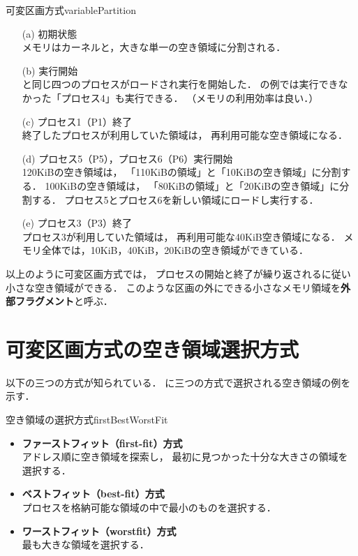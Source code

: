{可変区画方式}{variablePartition}

\begin{enumerate}
\item[(a)] 初期状態 \\
メモリはカーネルと，大きな単一の空き領域に分割される．
\item[(b)] 実行開始 \\
と同じ四つのプロセスがロードされ実行を開始した．
の例では実行できなかった「プロセス4」も実行できる．
（メモリの利用効率は良い．）
\item[(c)] プロセス1（P1）終了 \\
終了したプロセスが利用していた領域は，
再利用可能な空き領域になる．
\item[(d)] プロセス5（P5），プロセス6（P6）実行開始 \\
120KiBの空き領域は，
「110KiBの領域」と「10KiBの空き領域」に分割する．
100KiBの空き領域は，
「80KiBの領域」と「20KiBの空き領域」に分割する．
プロセス5とプロセス6を新しい領域にロードし実行する．
\item[(e)] プロセス3（P3）終了 \\
プロセス3が利用していた領域は，
再利用可能な40KiB空き領域になる．
メモリ全体では，10KiB，40KiB，20KiBの空き領域ができている．
\end{enumerate}

以上のように可変区画方式では，
プロセスの開始と終了が繰り返されるに従い小さな空き領域ができる．
このような区画の外にできる小さなメモリ領域を{\bf 外部フラグメント}と呼ぶ．

\section{可変区画方式の空き領域選択方式}
以下の三つの方式が知られている．
に三つの方式で選択される空き領域の例を示す．

{空き領域の選択方式}{firstBestWorstFit}

\begin{itemize}
\item {\bf ファーストフィット（first-fit）方式}\\
アドレス順に空き領域を探索し，
最初に見つかった十分な大きさの領域を選択する．

\item {\bf ベストフィット（best-fit）方式}\\
プロセスを格納可能な領域の中で最小のものを選択する．

\item {\bf ワーストフィット（worstfit）方式}\\
最も大きな領域を選択する．
\end{itemize}

